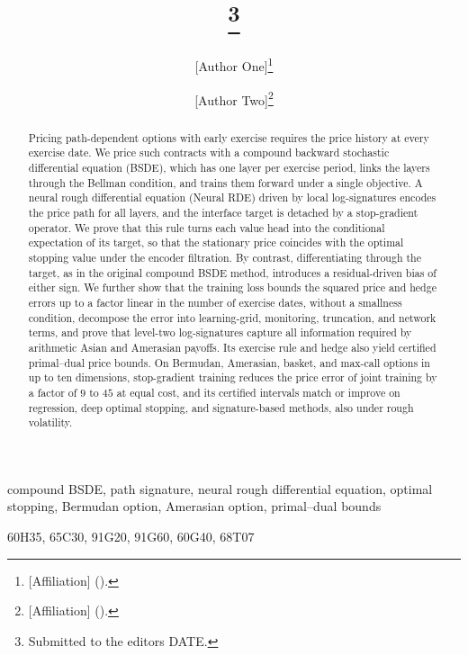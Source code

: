 \documentclass[final,onefignum,onetabnum]{siamart220329}
\title{{\TheTitle}\thanks{Submitted to the editors DATE.
\funding{[Funding information.]}}}
\author{[Author One]\thanks{[Affiliation]
  (\email{[email]}).}
\and [Author Two]\thanks{[Affiliation]
  (\email{[email]}).}}
\begin{document}
\maketitle

\begin{abstract}
Pricing path-dependent options with early exercise requires the price history at every exercise date. We price such contracts with a compound backward stochastic differential equation (BSDE), which has one layer per exercise period, links the layers through the Bellman condition, and trains them forward under a single objective. A neural rough differential equation (Neural RDE) driven by local log-signatures encodes the price path for all layers, and the interface target is detached by a stop-gradient operator. We prove that this rule turns each value head into the conditional expectation of its target, so that the stationary price coincides with the optimal stopping value under the encoder filtration. By contrast, differentiating through the target, as in the original compound BSDE method, introduces a residual-driven bias of either sign. We further show that the training loss bounds the squared price and hedge errors up to a factor linear in the number of exercise dates, without a smallness condition, decompose the error into learning-grid, monitoring, truncation, and network terms, and prove that level-two log-signatures capture all information required by arithmetic Asian and Amerasian payoffs. Its exercise rule and hedge also yield certified primal--dual price bounds. On Bermudan, Amerasian, basket, and max-call options in up to ten dimensions, stop-gradient training reduces the price error of joint training by a factor of $9$ to $45$ at equal cost, and its certified intervals match or improve on regression, deep optimal stopping, and signature-based methods, also under rough volatility.
\end{abstract}

\begin{keywords}
compound BSDE, path signature, neural rough differential equation, optimal stopping, Bermudan option, Amerasian option, primal--dual bounds
\end{keywords}

\begin{MSCcodes}
60H35, 65C30, 91G20, 91G60, 60G40, 68T07
\end{MSCcodes}








\appendix




\end{document}
